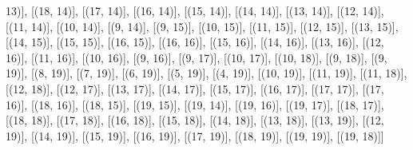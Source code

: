13)], [(18, 14)], [(17, 14)], [(16, 14)], [(15, 14)], [(14, 14)], [(13, 14)], [(12, 14)], [(11, 14)], [(10, 14)], [(9, 14)], [(9, 15)], [(10, 15)], [(11, 15)], [(12, 15)], [(13, 15)], [(14, 15)], [(15, 15)], [(16, 15)], [(16, 16)], [(15, 16)], [(14, 16)], [(13, 16)], [(12, 16)], [(11, 16)], [(10, 16)], [(9, 16)], [(9, 17)], [(10, 17)], [(10, 18)], [(9, 18)], [(9, 19)], [(8, 19)], [(7, 19)], [(6, 19)], [(5, 19)], [(4, 19)], [(10, 19)], [(11, 19)], [(11, 18)], [(12, 18)], [(12, 17)], [(13, 17)], [(14, 17)], [(15, 17)], [(16, 17)], [(17, 17)], [(17, 16)], [(18, 16)], [(18, 15)], [(19, 15)], [(19, 14)], [(19, 16)], [(19, 17)], [(18, 17)], [(18, 18)], [(17, 18)], [(16, 18)], [(15, 18)], [(14, 18)], [(13, 18)], [(13, 19)], [(12, 19)], [(14, 19)], [(15, 19)], [(16, 19)], [(17, 19)], [(18, 19)], [(19, 19)], [(19, 18)]]
